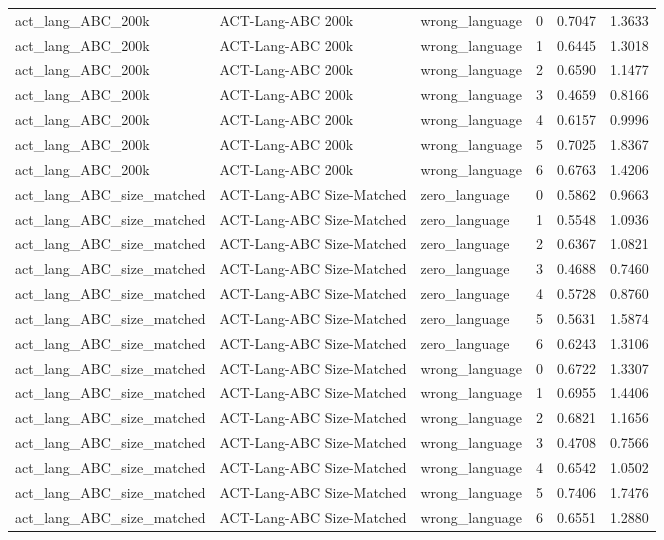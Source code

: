 \begin{tabular}{lllrrr}
act\_lang\_ABC\_200k & ACT-Lang-ABC 200k & wrong\_language & 0 & 0.7047 & 1.3633 \\
act\_lang\_ABC\_200k & ACT-Lang-ABC 200k & wrong\_language & 1 & 0.6445 & 1.3018 \\
act\_lang\_ABC\_200k & ACT-Lang-ABC 200k & wrong\_language & 2 & 0.6590 & 1.1477 \\
act\_lang\_ABC\_200k & ACT-Lang-ABC 200k & wrong\_language & 3 & 0.4659 & 0.8166 \\
act\_lang\_ABC\_200k & ACT-Lang-ABC 200k & wrong\_language & 4 & 0.6157 & 0.9996 \\
act\_lang\_ABC\_200k & ACT-Lang-ABC 200k & wrong\_language & 5 & 0.7025 & 1.8367 \\
act\_lang\_ABC\_200k & ACT-Lang-ABC 200k & wrong\_language & 6 & 0.6763 & 1.4206 \\
act\_lang\_ABC\_size\_matched & ACT-Lang-ABC Size-Matched & zero\_language & 0 & 0.5862 & 0.9663 \\
act\_lang\_ABC\_size\_matched & ACT-Lang-ABC Size-Matched & zero\_language & 1 & 0.5548 & 1.0936 \\
act\_lang\_ABC\_size\_matched & ACT-Lang-ABC Size-Matched & zero\_language & 2 & 0.6367 & 1.0821 \\
act\_lang\_ABC\_size\_matched & ACT-Lang-ABC Size-Matched & zero\_language & 3 & 0.4688 & 0.7460 \\
act\_lang\_ABC\_size\_matched & ACT-Lang-ABC Size-Matched & zero\_language & 4 & 0.5728 & 0.8760 \\
act\_lang\_ABC\_size\_matched & ACT-Lang-ABC Size-Matched & zero\_language & 5 & 0.5631 & 1.5874 \\
act\_lang\_ABC\_size\_matched & ACT-Lang-ABC Size-Matched & zero\_language & 6 & 0.6243 & 1.3106 \\
act\_lang\_ABC\_size\_matched & ACT-Lang-ABC Size-Matched & wrong\_language & 0 & 0.6722 & 1.3307 \\
act\_lang\_ABC\_size\_matched & ACT-Lang-ABC Size-Matched & wrong\_language & 1 & 0.6955 & 1.4406 \\
act\_lang\_ABC\_size\_matched & ACT-Lang-ABC Size-Matched & wrong\_language & 2 & 0.6821 & 1.1656 \\
act\_lang\_ABC\_size\_matched & ACT-Lang-ABC Size-Matched & wrong\_language & 3 & 0.4708 & 0.7566 \\
act\_lang\_ABC\_size\_matched & ACT-Lang-ABC Size-Matched & wrong\_language & 4 & 0.6542 & 1.0502 \\
act\_lang\_ABC\_size\_matched & ACT-Lang-ABC Size-Matched & wrong\_language & 5 & 0.7406 & 1.7476 \\
act\_lang\_ABC\_size\_matched & ACT-Lang-ABC Size-Matched & wrong\_language & 6 & 0.6551 & 1.2880 \\
\bottomrule
\end{tabular}
